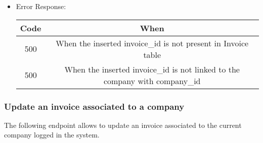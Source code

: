 \begin{itemize}
    \item Error Response:
    \begin{table}[!h]
    \centering 
    \begin{tabular}{|c|c|}
    \hline
    \multicolumn{1}{|c|}{\textbf{Code}} & \multicolumn{1}{c|}{\textbf{When}} \\ \hline
    500 & When the inserted invoice\_id is not present in Invoice table \\\hline
    500 & When the inserted invoice\_id is not linked to the company with company\_id \\\hline
    \end{tabular} 
    \end{table} 
    
\end{itemize}


\subsubsection*{Update an invoice associated to a company}

The following endpoint allows to update an invoice associated to the current company logged in the system.

